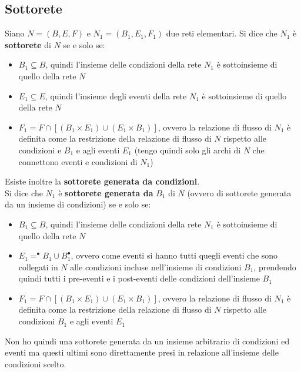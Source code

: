 \subsection{Sottorete}
Siano $N=(B,E,F)$ e $N_1=(B_1,E_1,F_1)$ due reti elementari. Si dice che $N_1$ è \textbf{sottorete} di $N$  se e solo se: 
\begin{itemize} 
    \item $B_1\subseteq B$, quindi l'insieme delle condizioni della rete $N_1$ è sottoinsieme di quello della rete $N$ 
    \item $E_1\subseteq E$, quindi l'insieme degli eventi della rete $N_1$ è sottoinsieme di quello della rete $N$ 
    \item $F_1=F\cap[(B_1\times E_1)\cup (E_1\times B_1)]$, ovvero la relazione di flusso di $N_1$ è definita come la restrizione della relazione di flusso di $N$ rispetto alle condizioni e $B_1$ e agli eventi $E_1$ (tengo quindi solo gli archi di $N$ che connettono eventi e condizioni di $N_1$) 
\end{itemize}

Esiste inoltre la \textbf{sottorete generata da condizioni}.\\
Si dice che $N_1$ è \textbf{sottorete generata da} $B_1$ di $N$ (ovvero di sottorete generata da un insieme di condizioni)  se e solo se: 
\begin{itemize}
    \item $B_1\subseteq B$, quindi l'insieme delle condizioni della rete $N_1$ è sottoinsieme di quello della rete $N$ 
    \item $E_1=  ^\bullet B_1\cup B_1^\bullet$, ovvero come eventi si hanno tutti quegli eventi che sono collegati in $N$ alle condizioni incluse nell'insieme di condizioni $B_1$, prendendo quindi tutti i pre-eventi e i post-eventi delle condizioni dell'insieme $B_1$ 
    \item $F_1=F\cap[(B_1\times E_1)\cup (E_1\times B_1)]$, ovvero la relazione di flusso di $N_1$ è definita come la restrizione della relazione di flusso di $N$ rispetto alle condizioni $B_1$ e agli eventi $E_1$ 
\end{itemize} 
Non ho quindi una sottorete generata da un insieme arbitrario di condizioni ed eventi ma questi ultimi sono direttamente presi in relazione all'insieme delle condizioni scelto.\\

